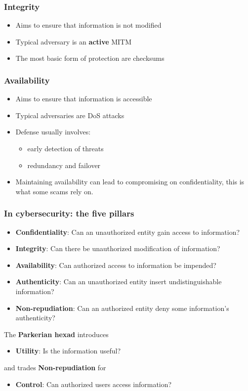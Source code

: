 \begin{frame}
  \frametitle{Integrity}
  \begin{itemize}
    \item Aims to ensure that information is not modified
    \item Typical adversary is an \textbf{active} MITM
    \item The most basic form of protection are checksums
  \end{itemize}
\end{frame}

\begin{frame}
  \frametitle{Availability}
  \begin{itemize}
    \item Aims to ensure that information is accessible
    \item Typical adversaries are DoS attacks
    \item Defense usually involves:
    \begin{itemize}
      \item early detection of threats
      \item redundancy and failover
    \end{itemize}
    \item Maintaining availability can lead to compromising on confidentiality,
          this is what some scams rely on.
  \end{itemize}
\end{frame}

\begin{frame}
  \frametitle{In cybersecurity: the five pillars}
  \begin{itemize}
    \item \textbf{Confidentiality}:
          Can an unauthorized entity gain access to information?
    \item \textbf{Integrity}:
          Can there be unauthorized modification of information?
    \item \textbf{Availability}:
          Can authorized access to information be impended?
    \item \textbf{Authenticity}:
          Can an unauthorized entity insert undistinguishable information?
    \item \textbf{Non-repudiation}:
          Can an authorized entity deny some information's authenticity?
  \end{itemize}
  The \textbf{Parkerian hexad} introduces
  \begin{itemize}
    \item \textbf{Utility}:
          Is the information useful?
  \end{itemize}
  and trades \textbf{Non-repudiation} for
  \begin{itemize}
    \item \textbf{Control}:
          Can authorized users access information?
  \end{itemize}
\end{frame}

